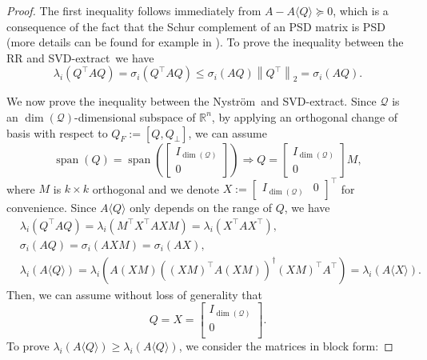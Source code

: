 \documentclass[onefignum,onetabnum]{siamart251216}
\def\subspace{\mathcal{Q}}
\def\Nystrom{Nystr{\"o}m}
\def\svdmethod{SVD-extract}
\newcommand{\image}{\operatorname{span}}
\begin{document}
\begin{proof}
    The first inequality follows immediately from $A - A\langle Q \rangle \succeq 0$, which is a consequence of the fact that the Schur complement of an PSD matrix is PSD (more details can be found for example in \cite[Section 4.6]{tropp2023randomized}). To prove the inequality between the RR and \svdmethod\, we have
    \[
        \lambda_{i} (Q^\top A Q) = \sigma_{i} (Q^\top A Q) \leq \sigma_{i} (AQ) \left\|Q^\top\right\|_2 = \sigma_{i} (AQ).
    \]
    
    We now prove the inequality between the \Nystrom\ and \svdmethod. Since $\subspace$ is an $\dim(\subspace)$-dimensional subspace of $\mathbb{R}^{n}$, by applying an orthogonal change of basis with respect to $Q_F := [Q,Q_\perp]$, we can assume
    \[
        \image(Q) =
        \image\left(
        \begin{bmatrix}
            I_{\dim(\subspace)} \\
            0
        \end{bmatrix}
        \right)
        \Rightarrow
        Q = 
        \begin{bmatrix}
            I_{\dim(\subspace)} \\
            0
        \end{bmatrix}
        M,
    \]
    where $M$ is $k\times k$ orthogonal and we denote $X := \begin{bmatrix}
        I_{\dim(\subspace)} & 0
    \end{bmatrix}^\top$ for convenience. Since $A \langle Q \rangle$ only depends on the range of $Q$, we have 
    \[
        \begin{aligned}
            & \lambda_{i} (Q^\top AQ) = \lambda_{i} (M^\top X^\top A X M) = \lambda_{i} (X^\top A X^\top), \\
            & \sigma_{i} (AQ) = \sigma_{i} (AXM) = \sigma_{i} (AX), \\
            & \lambda_{i} \left(A \langle Q \rangle\right) = \lambda_{i} \left(A(XM) \left((XM)^\top A (XM)\right)^{\dagger} (XM)^\top A^\top\right)  = \lambda_{i} (A \langle X \rangle).
        \end{aligned}
    \]
    Then, we can assume without loss of generality that
    \[
        Q = X
        =
        \begin{bmatrix}
        I_{\dim(\subspace)} \\
        0 \\
        \end{bmatrix}.
    \]
    To prove $\lambda_i(A\langle Q \rangle) \geq \lambda_i(A\langle Q \rangle)$, we consider the matrices in block form:

\end{proof}
\end{document}
